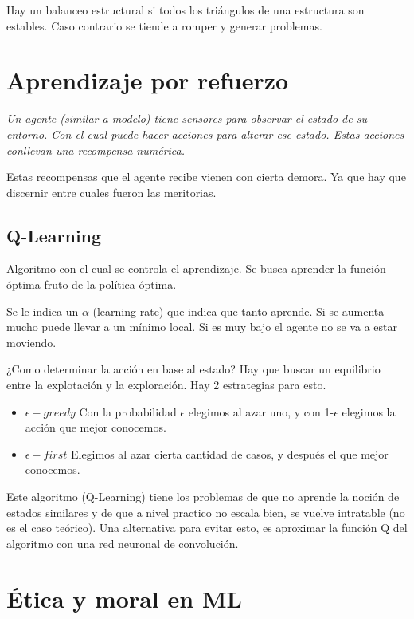 \documentclass[titlepage,a4paper]{article}
\begin{document}
Hay un balanceo estructural si todos los triángulos de una estructura son estables. Caso contrario se tiende a romper y generar problemas.

\section{Aprendizaje por refuerzo}
\textit{
Un \underline{agente} (similar a modelo) tiene sensores para observar el \underline{estado} de su entorno. Con el cual puede hacer \underline{acciones} para alterar ese estado. Estas acciones conllevan una \underline{recompensa} numérica.
}


Estas recompensas que el agente recibe vienen con cierta demora. Ya que hay que discernir entre cuales fueron las meritorias.


\subsection{Q-Learning}
Algoritmo con el cual se controla el aprendizaje. Se busca aprender la función óptima fruto de la política óptima.

Se le indica un $\alpha$ (learning rate) que indica que tanto aprende. Si se aumenta mucho puede llevar a un mínimo local. Si es muy bajo el agente no se va a estar moviendo.

¿Como determinar la acción en base al estado? Hay que buscar un equilibrio entre la explotación y la exploración. Hay 2 estrategias para esto.

\begin{itemize} %
    \item $\epsilon-greedy$ Con la probabilidad $\epsilon$ elegimos al azar uno, y con 1-$\epsilon$ elegimos la acción que mejor conocemos.
    \item $\epsilon-first$ Elegimos al azar cierta cantidad de casos, y después el que mejor conocemos. 
\end{itemize}

Este algoritmo (Q-Learning) tiene los problemas de que no aprende la noción de estados similares y de que a nivel practico no escala bien, se vuelve intratable (no es el caso teórico). Una alternativa para evitar esto, es aproximar la función Q del algoritmo con una red neuronal de convolución.

\section{Ética y moral en ML}
\end{document}
